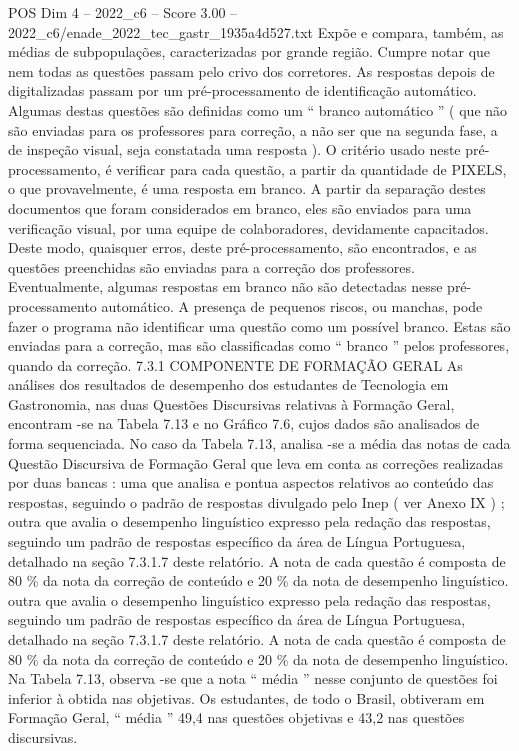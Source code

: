 \begin{textsample}{POS Dim 4 – 2022\_c6 – Score 3.00 – 2022\_c6/enade\_2022\_tec\_gastr\_1935a4d527.txt}
Expõe e compara, também, as médias de subpopulações, caracterizadas por grande região.
Cumpre notar que nem todas as questões passam pelo crivo dos corretores.
As respostas depois de digitalizadas passam por um pré-processamento de identificação automático.
Algumas destas questões são definidas como um “ branco automático ” ( que não são enviadas para os professores para correção, a não ser que na segunda fase, a de inspeção visual, seja constatada uma resposta ).
O critério usado neste pré-processamento, é verificar para cada questão, a partir da quantidade de PIXELS, o que provavelmente, é uma resposta em branco.
A partir da separação destes documentos que foram considerados em branco, eles são enviados para uma verificação visual, por uma equipe de colaboradores, devidamente capacitados.
Deste modo, quaisquer erros, deste pré-processamento, são encontrados, e as questões preenchidas são enviadas para a correção dos professores.
Eventualmente, algumas respostas em branco não são detectadas nesse pré-processamento automático.
A presença de pequenos riscos, ou manchas, pode fazer o programa não identificar uma questão como um possível branco.
Estas são enviadas para a correção, mas são classificadas como “ branco ” pelos professores, quando da correção. 7.3.1 COMPONENTE DE FORMAÇÃO GERAL As análises dos resultados de desempenho dos estudantes de Tecnologia em Gastronomia, nas duas Questões Discursivas relativas à Formação Geral, encontram -se na Tabela 7.13 e no Gráfico 7.6, cujos dados são analisados de forma sequenciada.
No caso da Tabela 7.13, analisa -se a média das notas de cada Questão Discursiva de Formação Geral que leva em conta as correções realizadas por duas bancas : uma que analisa e pontua aspectos relativos ao conteúdo das respostas, seguindo o padrão de respostas divulgado pelo Inep ( ver Anexo IX ) ; outra que avalia o desempenho linguístico expresso pela redação das respostas, seguindo um padrão de respostas específico da área de Língua Portuguesa, detalhado na seção 7.3.1.7 deste relatório.
A nota de cada questão é composta de 80 \% da nota da correção de conteúdo e 20 \% da nota de desempenho linguístico. outra que avalia o desempenho linguístico expresso pela redação das respostas, seguindo um padrão de respostas específico da área de Língua Portuguesa, detalhado na seção 7.3.1.7 deste relatório.
A nota de cada questão é composta de 80 \% da nota da correção de conteúdo e 20 \% da nota de desempenho linguístico.
Na Tabela 7.13, observa -se que a nota “ média ” nesse conjunto de questões foi inferior à obtida nas objetivas.
Os estudantes, de todo o Brasil, obtiveram em Formação Geral, “ média ” 49,4 nas questões objetivas e 43,2 nas questões discursivas.

\end{textsample}
